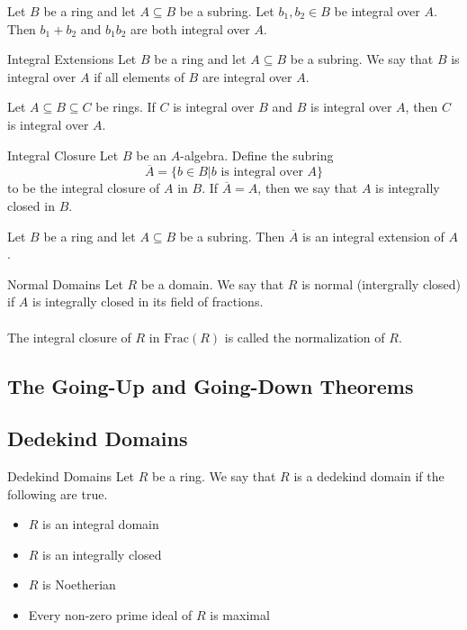 \documentclass[a4paper]{article}
\begin{document}
\begin{prp}{}{} Let $B$ be a ring and let $A\subseteq B$ be a subring. Let $b_1,b_2\in B$ be integral over $A$. Then $b_1+b_2$ and $b_1b_2$ are both integral over $A$. 
\end{prp}

\begin{defn}{Integral Extensions}{} Let $B$ be a ring and let $A\subseteq B$ be a subring. We say that $B$ is integral over $A$ if all elements of $B$ are integral over $A$. 
\end{defn}

\begin{lmm}{}{} Let $A\subseteq B\subseteq C$ be rings. If $C$ is integral over $B$ and $B$ is integral over $A$, then $C$ is integral over $A$. 
\end{lmm}

\begin{defn}{Integral Closure}{} Let $B$ be an $A$-algebra. Define the subring $$\overline{A}=\{b\in B|b\text{ is integral over }A\}$$ to be the integral closure of $A$ in $B$. If $\overline{A}=A$, then we say that $A$ is integrally closed in $B$. 
\end{defn}

\begin{lmm}{}{} Let $B$ be a ring and let $A\subseteq B$ be a subring. Then $\overline{A}$ is an integral extension of $A$. 
\end{lmm}

\begin{defn}{Normal Domains}{} Let $R$ be a domain. We say that $R$ is normal (intergrally closed) if $A$ is integrally closed in its field of fractions. \\~\\
The integral closure of $R$ in $\text{Frac}(R)$ is called the normalization of $R$. 
\end{defn}

\subsection{The Going-Up and Going-Down Theorems}

\subsection{Dedekind Domains}
\begin{defn}{Dedekind Domains}{} Let $R$ be a ring. We say that $R$ is a dedekind domain if the following are true. 
\begin{itemize}
\item $R$ is an integral domain
\item $R$ is an integrally closed
\item $R$ is Noetherian
\item Every non-zero prime ideal of $R$ is maximal
\end{itemize}
\end{defn}
\end{document}

